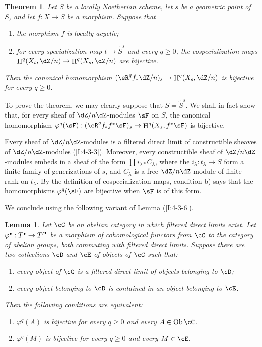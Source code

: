 \documentclass[12pt,oneside,english]{smfbook}
\DeclareMathOperator{\h}{H}
\DeclareMathOperator{\ob}{Ob}
\newtheorem{theorem}[subsubsection]{Theorem}
\newtheorem{lemma}[subsubsection]{Lemma}
\let\oldbullet\bullet
\renewcommand{\bullet}{\textnormal{\tiny$\oldbullet$}}
\begin{document}
\begin{theorem}\label{I:5-1-7}
Let $S$ be a locally Noetherian scheme, let $s$ be a geometric point of $S$, and let $f:X\to S$ be a morphism. Suppose that
\begin{enumerate}[\indent a)]
  \item the morphism $f$ is locally acyclic;
  \item for every specialization map $t\to\widetilde S^s$ and every $q\geqslant0$, the cospecialization maps $\h^q(X_t,\dZ/n)\to\h^q(X_s,\dZ/n)$ are bijective.
\end{enumerate}

Then the canonical homomorphism $(\eR^qf_*\dZ/n)_s\to\h^q(X_s,\dZ/n)$ is bijective for every $q\geqslant0$.
\end{theorem}

To prove the theorem, we may clearly suppose that $S=\widetilde S^s$. We shall in fact show that, for every sheaf of $\dZ/n\dZ$-modules $\sF$ on $S$, the canonical homomorphism $\varphi^q(\sF):(\eR^qf_*f^*\sF)_s\to\h^q(X_s,f^*\sF)$ is bijective.

Every sheaf of $\dZ/n\dZ$-modules is a filtered direct limit of constructible sheaves of $\dZ/n\dZ$-modules (\ref{I:4-3-3}). Moreover, every constructible sheaf of $\dZ/n\dZ$-modules embeds in a sheaf of the form $\prod i_{\lambda*}C_\lambda$, where the $i_\lambda:t_\lambda\to S$ form a finite family of generizations of $s$, and $C_\lambda$ is a free $\dZ/n\dZ$-module of finite rank on $t_\lambda$. By the definition of cospecialization maps, condition b) says that the homomorphisms $\varphi^q(\sF)$ are bijective when $\sF$ is of this form.

We conclude using the following variant of Lemma (\ref{I:4-3-6}).

\begin{lemma}\label{I:5-1-8}
Let $\cC$ be an abelian category in which filtered direct limits exist. Let $\varphi^\bullet:T^\bullet\to{T'}^\bullet$ be a morphism of cohomological functors from $\cC$ to the category of abelian groups, both commuting with filtered direct limits. Suppose there are two collections $\cD$ and $\cE$ of objects of $\cC$ such that:
\begin{enumerate}[\indent a)]
  \item every object of $\cC$ is a filtered direct limit of objects belonging to $\cD$;
  \item every object belonging to $\cD$ is contained in an object belonging to $\cE$.
\end{enumerate}

Then the following conditions are equivalent:
\begin{enumerate}[\indent (i)]
  \item $\varphi^q(A)$ is bijective for every $q\geqslant0$ and every $A\in\ob\cC$.
  \item $\varphi^q(M)$ is bijective for every $q\geqslant0$ and every $M\in\cE$.
\end{enumerate}
\end{lemma}
\end{document}
